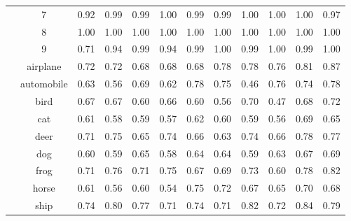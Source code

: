 \begin{table}[ht!]
{\begin{tabular}{c c c c c c c c c c c c }
    & 7 & 0.92 & \cellcolor{gray!30} 0.99 & \cellcolor{gray!30} 0.99 & \cellcolor{gray!45} 1.00 & \cellcolor{gray!30} 0.99 & \cellcolor{gray!30} 0.99 & \cellcolor{gray!45} 1.00 & \cellcolor{gray!45} 1.00 & \cellcolor{gray!45} 1.00 & \cellcolor{gray!15} 0.97  \\ 
    & 8 & \cellcolor{gray!45} 1.00 & \cellcolor{gray!45} 1.00 & \cellcolor{gray!45} 1.00 & \cellcolor{gray!45} 1.00 & \cellcolor{gray!45} 1.00 & \cellcolor{gray!45} 1.00 & \cellcolor{gray!45} 1.00 & \cellcolor{gray!45} 1.00 & \cellcolor{gray!45} 1.00 & \cellcolor{gray!45} 1.00  \\ 
    & 9 & 0.71 & \cellcolor{gray!15} 0.94 & \cellcolor{gray!30} 0.99 & \cellcolor{gray!15} 0.94 & \cellcolor{gray!30} 0.99 & \cellcolor{gray!45} 1.00 & \cellcolor{gray!30} 0.99 & \cellcolor{gray!45} 1.00 & \cellcolor{gray!30} 0.99 & \cellcolor{gray!45} 1.00  \\ 
  \midrule
    \parbox[t]{1mm}{} & airplane & 0.72 & 0.72 & 0.68 & 0.68 & 0.68 &  0.78 &  0.78 & 0.76 &  0.81 &  0.87  \\ 
    & automobile & 0.63 & 0.56 & 0.69 & 0.62 &  0.78 &  0.75 & 0.46 &  0.76 & 0.74 &  0.78  \\ 
    & bird & 0.67 & 0.67 & 0.60 & 0.66 & 0.60 & 0.56 &  0.70 & 0.47 &  0.68 &  0.72  \\ 
    & cat & 0.61 & 0.58 & 0.59 & 0.57 &  0.62 & 0.60 & 0.59 & 0.56 &  0.69 &  0.65  \\ 
    & deer & 0.71 &  0.75 & 0.65 & 0.74 & 0.66 & 0.63 & 0.74 & 0.66 &  0.78 &  0.77  \\ 
    & dog & 0.60 & 0.59 &  0.65 & 0.58 & 0.64 & 0.64 & 0.59 & 0.63 &  0.67 &  0.69  \\ 
    & frog & 0.71 &  0.76 & 0.71 & 0.75 & 0.67 & 0.69 & 0.73 & 0.60 &  0.78 &  0.82  \\ 
    & horse & 0.61 & 0.56 & 0.60 & 0.54 &  0.75 &  0.72 & 0.67 & 0.65 &  0.70 & 0.68  \\ 
    & ship & 0.74 &  0.80 & 0.77 & 0.71 & 0.74 & 0.71 &  0.82 & 0.72 &  0.84 & 0.79  \\ 

\end{tabular}}
\end{table}
